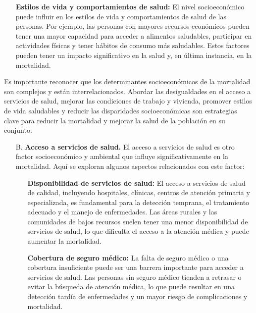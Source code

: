 \documentclass[8pt,a4paper]{beamer}
\begin{document}
{\begin{frame}{}
\begin{block}{}
\begin{enumerate}
\begin{enumerate}
\item[\ding{99}] \textbf{Estilos de vida y comportamientos de salud:} El nivel socioeconómico puede influir en los estilos de vida y comportamientos de salud de las personas. Por ejemplo, las personas con mayores recursos económicos pueden tener una mayor capacidad para acceder a alimentos saludables, participar en actividades físicas y tener hábitos de consumo más saludables. Estos factores pueden tener un impacto significativo en la salud y, en última instancia, en la mortalidad.
\end{enumerate}
Es importante reconocer que los determinantes socioeconómicos de la mortalidad son complejos y están interrelacionados. Abordar las desigualdades en el acceso a servicios de salud, mejorar las condiciones de trabajo y vivienda, promover estilos de vida saludables y reducir las disparidades socioeconómicas son estrategias clave para reducir la mortalidad y mejorar la salud de la población en su conjunto.
\end{enumerate}
\end{block}
\end{frame}

\begin{frame}{}
\setlength{\parskip}{3px}
\justifying
\begin{block}{}
\setlength{\parskip}{3px}
\justifying
\begin{enumerate}
\setlength{\parskip}{3px}
\justifying
\item[B.] \textbf{Acceso a servicios de salud.} El acceso a servicios de salud es otro factor socioeconómico y ambiental que influye significativamente en la mortalidad. Aquí se exploran algunos aspectos relacionados con este factor: 
\begin{enumerate}
\setlength{\parskip}{3px}
\justifying
\item[\ding{99}] \textbf{Disponibilidad de servicios de salud:} El acceso a servicios de salud de calidad, incluyendo hospitales, clínicas, centros de atención primaria y especializada, es fundamental para la detección temprana, el tratamiento adecuado y el manejo de enfermedades. Las áreas rurales y las comunidades de bajos recursos suelen tener una menor disponibilidad de servicios de salud, lo que dificulta el acceso a la atención médica y puede aumentar la mortalidad.

\item[\ding{99}] \textbf{Cobertura de seguro médico:} La falta de seguro médico o una cobertura insuficiente puede ser una barrera importante para acceder a servicios de salud. Las personas sin seguro médico tienden a retrasar o evitar la búsqueda de atención médica, lo que puede resultar en una detección tardía de enfermedades y un mayor riesgo de complicaciones y mortalidad.


\end{enumerate}
\end{enumerate}
\end{block}
\end{frame}}
\end{document}
